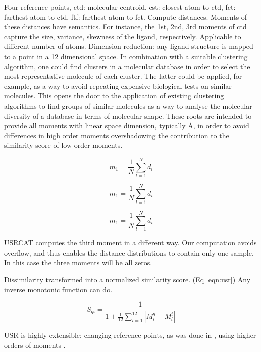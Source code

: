 Four reference points, ctd: molecular centroid, cst: closest atom to ctd, fct: farthest atom to ctd, ftf: farthest atom to fct. Compute distances. Moments of these distances have semantics. For instance, the 1st, 2nd, 3rd moments of ctd capture the size, variance, skewness of the ligand, respectively. Applicable to different number of atoms. Dimension reduction: any ligand structure is mapped to a point in a 12 dimensional space. In combination with a suitable clustering algorithm, one could find clusters in a molecular database in order to select the most representative molecule of each cluster. The latter could be applied, for example, as a way to avoid repeating expensive biological tests on similar molecules.  This opens the door to the application of existing clustering algorithms to find groups of similar molecules as a way to analyse the molecular diversity of a database in terms of molecular shape. These roots are intended to provide all moments with linear space dimension, typically \AA, in order to avoid differences in high order moments overshadowing the contribution to the similarity score of low order moments.

\begin{equation}
m_1=\frac{1}{N}\sum_{l=1}^{N}d_i
\label{eqn:moment1}
\end{equation}

\begin{equation}
m_1=\frac{1}{N}\sum_{l=1}^{N}d_i
\label{eqn:moment2}
\end{equation}

\begin{equation}
m_1=\frac{1}{N}\sum_{l=1}^{N}d_i
\label{eqn:moment3}
\end{equation}

USRCAT computes the third moment in a different way. Our computation avoids overflow, and thus enables the distance distributions to contain only one sample. In this case the three moments will be all zeros.

Dissimilarity transformed into a normalized similarity score. (Eq \ref{eqn:usr}) Any inverse monotonic function can do.

\begin{equation}
S_{qi}=\frac{1}{1+\frac{1}{12}\sum_{l=1}^{12}|M_l^q-M_l^i|}
\label{eqn:usr}
\end{equation}

USR is highly extensible: changing reference points, as was done in \citep{1334,1335}, using higher orders of moments \citep{1333}.

